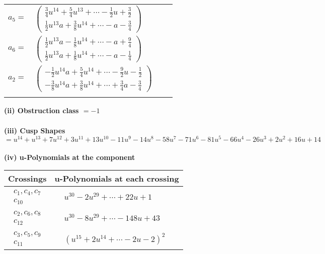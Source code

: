 \documentclass[1p]{elsarticle_modified}
\theoremstyle{definition}
\begin{document}
\begin{tabular}{m{7pt} m{180pt} m{7pt} m{180pt} }
\flushright $a_{5}=$&$\begin{pmatrix}\frac{3}{4} u^{14}+\frac{5}{4} u^{13}+\cdots-\frac{1}{2} u+\frac{3}{2}\\\frac{1}{2} u^{13} a+\frac{3}{8} u^{14}+\cdots- a-\frac{3}{4}\end{pmatrix}$ \\
\flushright $a_{6}=$&$\begin{pmatrix}\frac{1}{2} u^{13} a-\frac{1}{8} u^{14}+\cdots- a+\frac{9}{4}\\\frac{1}{2} u^{13} a+\frac{1}{8} u^{14}+\cdots- a-\frac{1}{4}\end{pmatrix}$ \\
\flushright $a_{2}=$&$\begin{pmatrix}-\frac{1}{2} u^{14} a+\frac{5}{4} u^{14}+\cdots-\frac{9}{2} u-\frac{1}{2}\\-\frac{3}{8} u^{14} a+\frac{3}{8} u^{14}+\cdots+\frac{3}{4} a-\frac{3}{4}\end{pmatrix}$\\&\end{tabular}
\flushleft \textbf{(ii) Obstruction class $= -1$}\\~\\
\flushleft \textbf{(iii) Cusp Shapes $= u^{14}+u^{13}+7 u^{12}+3 u^{11}+13 u^{10}-11 u^9-14 u^8-58 u^7-71 u^6-81 u^5-66 u^4-26 u^3+2 u^2+16 u+14$}\\~\\
\newpage\renewcommand{\arraystretch}{1}
\flushleft \textbf{(iv) u-Polynomials at the component}\newline \\
\begin{tabular}{m{50pt}|m{274pt}}
Crossings & \hspace{64pt}u-Polynomials at each crossing \\
\hline $$\begin{aligned}c_{1},c_{4},c_{7}\\c_{10}\end{aligned}$$&$\begin{aligned}
&u^{30}-2 u^{29}+\cdots+22 u+1
\end{aligned}$\\
\hline $$\begin{aligned}c_{2},c_{6},c_{8}\\c_{12}\end{aligned}$$&$\begin{aligned}
&u^{30}-8 u^{29}+\cdots-148 u+43
\end{aligned}$\\
\hline $$\begin{aligned}c_{3},c_{5},c_{9}\\c_{11}\end{aligned}$$&$\begin{aligned}
&(u^{15}+2 u^{14}+\cdots-2 u-2)^{2}
\end{aligned}$\\
\hline
\end{tabular}\\~\\
\end{document}
